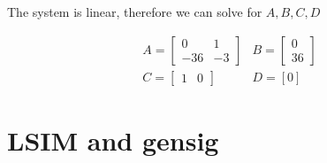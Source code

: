 \documentclass[12pt]{article}
\begin{document}
		The system is linear, therefore we can solve for $A, B, C, D$
		
		$$
		\begin{array}{ll}
			A=\left[\begin{array}{cc}
				0 & 1 \\
				-36 & -3
			\end{array}\right] & B=\left[\begin{array}{c}
				0 \\
				36
			\end{array}\right] \\
			C=\left[\begin{array}{ll}
				1 & 0
			\end{array}\right] & D=[0]
		\end{array}
		$$
	\section{LSIM and gensig}
		
		
		
\end{document}

